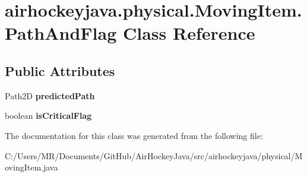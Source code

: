 \hypertarget{classairhockeyjava_1_1physical_1_1_moving_item_1_1_path_and_flag}{}\section{airhockeyjava.\+physical.\+Moving\+Item.\+Path\+And\+Flag Class Reference}
\label{classairhockeyjava_1_1physical_1_1_moving_item_1_1_path_and_flag}
\subsection*{Public Attributes}
\begin{DoxyCompactItemize}
\item 
\hypertarget{classairhockeyjava_1_1physical_1_1_moving_item_1_1_path_and_flag_acbba78ce0b17832aea69f896aa435839}{}Path2\+D {\bfseries predicted\+Path}\label{classairhockeyjava_1_1physical_1_1_moving_item_1_1_path_and_flag_acbba78ce0b17832aea69f896aa435839}

\item 
\hypertarget{classairhockeyjava_1_1physical_1_1_moving_item_1_1_path_and_flag_a30b0eec4aebf05a5ef5fe567f6e30ba7}{}boolean {\bfseries is\+Critical\+Flag}\label{classairhockeyjava_1_1physical_1_1_moving_item_1_1_path_and_flag_a30b0eec4aebf05a5ef5fe567f6e30ba7}

\end{DoxyCompactItemize}


The documentation for this class was generated from the following file\+:\begin{DoxyCompactItemize}
\item 
C\+:/\+Users/\+M\+R/\+Documents/\+Git\+Hub/\+Air\+Hockey\+Java/src/airhockeyjava/physical/Moving\+Item.\+java\end{DoxyCompactItemize}
